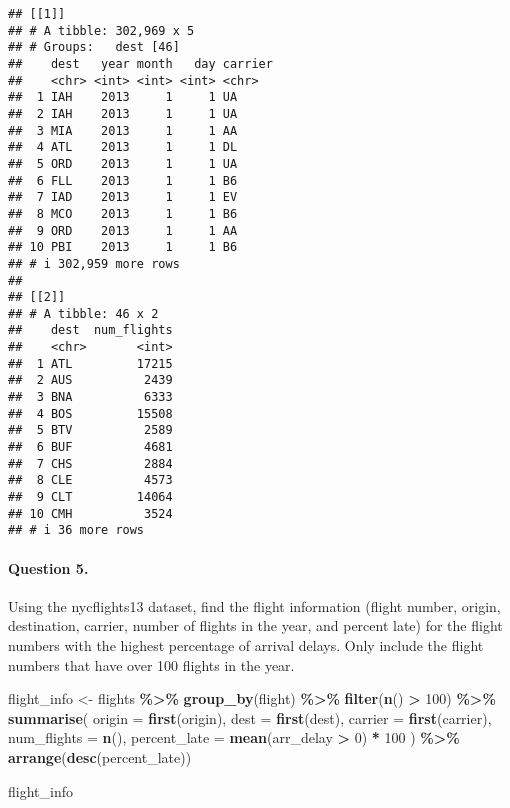 \documentclass[
]{article}
\newenvironment{Shaded}{\begin{snugshade}}{\end{snugshade}}
\newcommand{\AttributeTok}[1]{\textcolor[rgb]{0.13,0.29,0.53}{#1}}
\newcommand{\DecValTok}[1]{\textcolor[rgb]{0.00,0.00,0.81}{#1}}
\newcommand{\FunctionTok}[1]{\textcolor[rgb]{0.13,0.29,0.53}{\textbf{#1}}}
\newcommand{\NormalTok}[1]{#1}
\newcommand{\OtherTok}[1]{\textcolor[rgb]{0.56,0.35,0.01}{#1}}
\newcommand{\SpecialCharTok}[1]{\textcolor[rgb]{0.81,0.36,0.00}{\textbf{#1}}}
\begin{document}
\begin{verbatim}
## [[1]]
## # A tibble: 302,969 x 5
## # Groups:   dest [46]
##    dest   year month   day carrier
##    <chr> <int> <int> <int> <chr>  
##  1 IAH    2013     1     1 UA     
##  2 IAH    2013     1     1 UA     
##  3 MIA    2013     1     1 AA     
##  4 ATL    2013     1     1 DL     
##  5 ORD    2013     1     1 UA     
##  6 FLL    2013     1     1 B6     
##  7 IAD    2013     1     1 EV     
##  8 MCO    2013     1     1 B6     
##  9 ORD    2013     1     1 AA     
## 10 PBI    2013     1     1 B6     
## # i 302,959 more rows
## 
## [[2]]
## # A tibble: 46 x 2
##    dest  num_flights
##    <chr>       <int>
##  1 ATL         17215
##  2 AUS          2439
##  3 BNA          6333
##  4 BOS         15508
##  5 BTV          2589
##  6 BUF          4681
##  7 CHS          2884
##  8 CLE          4573
##  9 CLT         14064
## 10 CMH          3524
## # i 36 more rows
\end{verbatim}

\hypertarget{question-5.}{%
\paragraph{Question 5.}\label{question-5.}}

Using the nycflights13 dataset, find the flight information (flight
number, origin, destination, carrier, number of flights in the year, and
percent late) for the flight numbers with the highest percentage of
arrival delays. Only include the flight numbers that have over 100
flights in the year.

\begin{Shaded}
\begin{Highlighting}[]
\NormalTok{flight\_info }\OtherTok{\textless{}{-}}\NormalTok{ flights }\SpecialCharTok{\%\textgreater{}\%}
  \FunctionTok{group\_by}\NormalTok{(flight) }\SpecialCharTok{\%\textgreater{}\%}
  \FunctionTok{filter}\NormalTok{(}\FunctionTok{n}\NormalTok{() }\SpecialCharTok{\textgreater{}} \DecValTok{100}\NormalTok{) }\SpecialCharTok{\%\textgreater{}\%}
  \FunctionTok{summarise}\NormalTok{(}
    \AttributeTok{origin =} \FunctionTok{first}\NormalTok{(origin),}
    \AttributeTok{dest =} \FunctionTok{first}\NormalTok{(dest),}
    \AttributeTok{carrier =} \FunctionTok{first}\NormalTok{(carrier),}
    \AttributeTok{num\_flights =} \FunctionTok{n}\NormalTok{(),}
    \AttributeTok{percent\_late =} \FunctionTok{mean}\NormalTok{(arr\_delay }\SpecialCharTok{\textgreater{}} \DecValTok{0}\NormalTok{) }\SpecialCharTok{*} \DecValTok{100}
\NormalTok{  ) }\SpecialCharTok{\%\textgreater{}\%}
  \FunctionTok{arrange}\NormalTok{(}\FunctionTok{desc}\NormalTok{(percent\_late))}

\NormalTok{flight\_info}
\end{Highlighting}
\end{Shaded}
\end{document}

